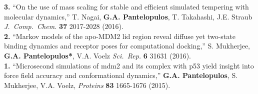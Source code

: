 \documentclass[a4paper]{article}
\def\jcc{\it J.~Comp.~Chem.}
\def\prot{\it Proteins}
\def\scirep{\it Sci.~Rep.}
\begin{document}
{\bf 3.} ``On the use of mass scaling for stable and efficient simulated tempering with molecular dynamics,'' T. Nagai, \textbf{G.A. Pantelopulos}, T. Takahashi, J.E. Straub {\jcc} {\bf 37} 2017-2028 (2016). \\
{\bf 2.} ``Markov models of the apo-MDM2 lid region reveal diffuse yet two-state binding dynamics and receptor poses for computational docking,'' S. Mukherjee, \textbf{G.A. Pantelopulos*}, V.A. Voelz {\scirep} {\bf 6} 31631 (2016). \\
{\bf 1.} ``Microsecond simulations of mdm2 and its complex with p53 yield insight into force field accuracy and conformational dynamics,'' \textbf{G.A. Pantelopulos}, S. Mukherjee, V.A. Voelz, {\prot} {\bf 83} 1665-1676 (2015).
\end{document}
